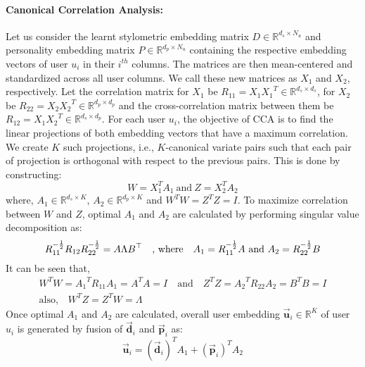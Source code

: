 \documentclass[11pt]{article}
\begin{document}
{\paragraph{Canonical Correlation Analysis:}
Let us consider the learnt stylometric embedding matrix $D \in \mathbb{R}^{d_s \times N_u}$ and personality embedding matrix  $P \in \mathbb{R}^{d_p \times N_u}$ containing the respective embedding vectors of user $u_i$ in their $i^{th}$ columns. The matrices are then mean-centered and standardized across all user columns. We call these new matrices as 
$X_1$ and $X_2$, respectively. Let the correlation matrix for $X_1$ be  $R_{11} = X_1{X_1}^T \in \mathbb{R}^{d_s \times d_s}$, for $X_2$  be $R_{22} = X_2{X_2}^T \in \mathbb{R}^{d_p \times d_p}$ and  the cross-correlation matrix between them be $R_{12} = X_1{X_2}^T \in \mathbb{R}^{d_s \times d_p}$. For each user $u_i$, the objective of CCA is to find the linear projections of both embedding vectors that have a maximum correlation. We create $K$ such projections, i.e., $K$-canonical variate pairs such that each pair of projection is orthogonal with respect to the previous pairs. This is done by constructing:
\begin{equation}
W = X_1^TA_1 \ \text{and}  \ Z = X_2^TA_2
\end{equation}
where, $A_1 \in \mathbb{R}^{d_s \times K}$, $A_2 \in \mathbb{R}^{d_p \times K}$ and $W^TW = Z^TZ = I$. To maximize correlation between $W$ and $Z$, optimal $A_1$ and $A_2$ are calculated by performing singular value decomposition as:
\begin{equation}
 R_{11}^{-\frac{1}{2}}R_{12}R_{22}^{-\frac{1}{2}} = A\Lambda B^\top  \quad \text{, where} \quad A_1 = R_{11}^{-\frac{1}{2}} A \textnormal{ and } A_2 = R_{22}^{-\frac{1}{2}}B
\end{equation}
It can be seen that,
\begin{gather}
W^TW = {A_1}^TR_{11}{A_1} = A^TA =  I \quad \text{and} \quad Z^TZ = {A_2}^TR_{22}{A_2} = B^TB =  I \\
\text{also,} \quad W^TZ = Z^TW = \Lambda
\end{gather}
Once optimal $A_1$ and $A_2$ are calculated, overall user embedding $\vec{\bm{u}}_{i} \in \mathbb{R}^{K}$ of user $u_i$ is generated by fusion of $\bm{\vec{d}}_{i}$ and $\bm{\vec{p}}_{i}$ as: 
\begin{equation}
\vec{\bm{u}}_{i} = {(\bm{\vec{d}}_{i})}^TA_1 + {(\bm{\vec{p}}_{i})}^TA_2 
\end{equation}

\vspace{-0.3cm}
}
\end{document}
